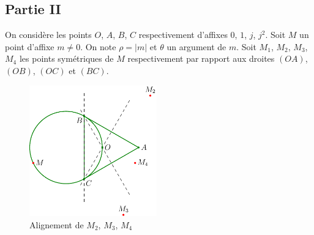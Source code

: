 \subsection*{Partie II} \noindent
On considère les points $O$, $A$, $B$, $C$ respectivement d'affixes $0$, $1$, $j$, $j^2$.\newline
Soit $M$ un point d'affixe $m \neq 0$. On note $\rho = \vert m \vert$ et $\theta$ un argument de $m$.\newline
Soit $M_1$, $M_2$, $M_3$, $M_4$ les points symétriques de $M$ respectivement par rapport aux droites $(OA)$, $(OB)$, $(OC)$ et $(BC)$.
\begin{figure}[ht]
 \centering
 \includegraphics[width=5.5cm]{Ecomp2_2.pdf}
 \caption{Alignement de $M_2$, $M_3$, $M_4$}
 \label{fig:Ecomp2_2}
\end{figure}

